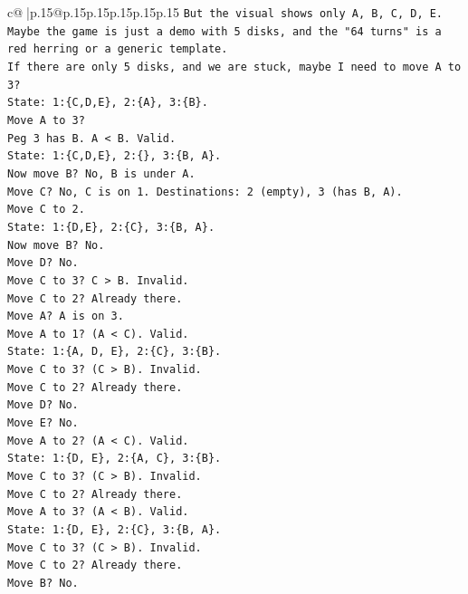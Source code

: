 \documentclass{article}
\begin{document}
{\begin{supertabular}{c@{$\;$}|p{.15\linewidth}@{}p{.15\linewidth}p{.15\linewidth}p{.15\linewidth}p{.15\linewidth}p{.15\linewidth}}
{{{\texttt{But the visual shows only A, B, C, D, E.} \\
\texttt{Maybe the game is just a demo with 5 disks, and the "64 turns" is a red herring or a generic template.} \\
\texttt{If there are only 5 disks, and we are stuck, maybe I need to move A to 3?} \\
\texttt{State: 1:\{C,D,E\}, 2:\{A\}, 3:\{B\}.} \\
\texttt{Move A to 3?} \\
\texttt{Peg 3 has B. A < B. Valid.} \\
\texttt{State: 1:\{C,D,E\}, 2:\{\}, 3:\{B, A\}.} \\
\texttt{Now move B? No, B is under A.} \\
\texttt{Move C? No, C is on 1. Destinations: 2 (empty), 3 (has B, A).} \\
\texttt{Move C to 2.} \\
\texttt{State: 1:\{D,E\}, 2:\{C\}, 3:\{B, A\}.} \\
\texttt{Now move B? No.} \\
\texttt{Move D? No.} \\
\texttt{Move C to 3? C > B. Invalid.} \\
\texttt{Move C to 2? Already there.} \\
\texttt{Move A? A is on 3.} \\
\texttt{Move A to 1? (A < C). Valid.} \\
\texttt{State: 1:\{A, D, E\}, 2:\{C\}, 3:\{B\}.} \\
\texttt{Move C to 3? (C > B). Invalid.} \\
\texttt{Move C to 2? Already there.} \\
\texttt{Move D? No.} \\
\texttt{Move E? No.} \\
\texttt{Move A to 2? (A < C). Valid.} \\
\texttt{State: 1:\{D, E\}, 2:\{A, C\}, 3:\{B\}.} \\
\texttt{Move C to 3? (C > B). Invalid.} \\
\texttt{Move C to 2? Already there.} \\
\texttt{Move A to 3? (A < B). Valid.} \\
\texttt{State: 1:\{D, E\}, 2:\{C\}, 3:\{B, A\}.} \\
\texttt{Move C to 3? (C > B). Invalid.} \\
\texttt{Move C to 2? Already there.} \\
\texttt{Move B? No.} \\
}}}
\end{supertabular}}
\end{document}
